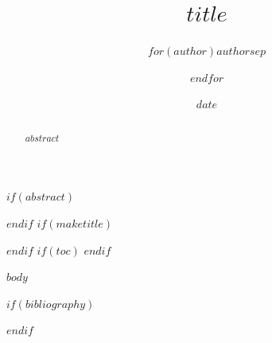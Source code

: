 \documentclass[$if(fontsize)$$fontsize$,$endif$]{article}
\title{$title$}
\author{$for(author)$$author$$sep$ \and $endfor$}
\date{$date$}
\begin{document}
$if(abstract)$
\begin{abstract}
$abstract$
\end{abstract}
$endif$
$if(maketitle)$
\maketitle
$endif$
$if(toc)$
\tableofcontents
$endif$

$body$

$if(bibliography)$


$endif$
\end{document}
